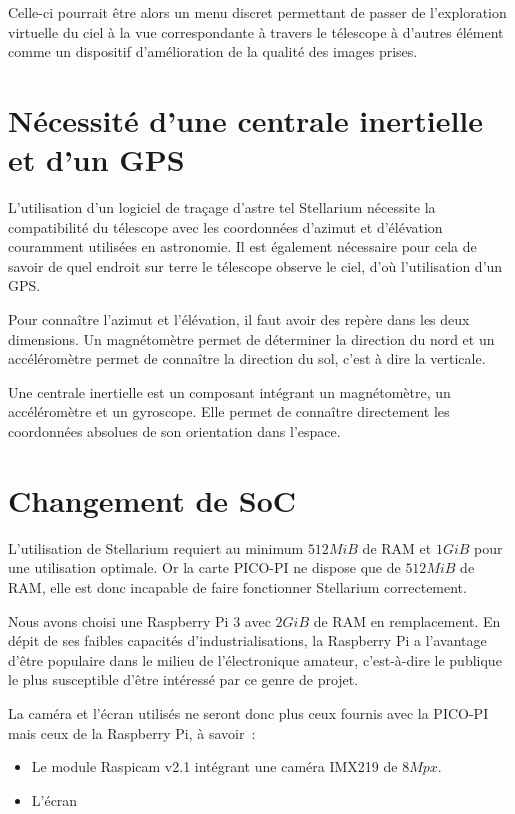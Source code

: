 Celle-ci pourrait être alors un menu discret permettant de passer de l'exploration virtuelle du ciel à la vue correspondante à travers le télescope à d'autres élément comme un dispositif d'amélioration de la qualité des images prises.

\section{Nécessité d'une centrale inertielle et d'un GPS}

L'utilisation d'un logiciel de traçage d'astre tel Stellarium nécessite la compatibilité du télescope avec les coordonnées d'azimut et d'élévation couramment utilisées en astronomie. Il est également nécessaire pour cela de savoir de quel endroit sur terre le télescope observe le ciel, d'où l'utilisation d'un GPS.

\vspace{1cm}

Pour connaître l'azimut et l'élévation, il faut avoir des repère dans les deux dimensions. Un magnétomètre permet de déterminer la direction du nord et un accéléromètre permet de connaître la direction du sol, c'est à dire la verticale.

Une centrale inertielle est un composant intégrant un magnétomètre, un accéléromètre et un gyroscope. Elle permet de connaître directement les coordonnées absolues de son orientation dans l'espace.

\section{Changement de SoC}

L'utilisation de Stellarium requiert au minimum $512MiB$ de RAM et $1GiB$ pour une utilisation optimale. Or la carte PICO-PI ne dispose que de $512MiB$ de RAM, elle est donc incapable de faire fonctionner Stellarium correctement.

\vspace{1cm}

Nous avons choisi une Raspberry Pi 3 avec $2GiB$ de RAM en remplacement. En dépit de ses faibles capacités d'industrialisations, la Raspberry Pi a l'avantage d'être populaire dans le milieu de l'électronique amateur, c'est-à-dire le publique le plus susceptible d'être intéressé par ce genre de projet.

\vspace{1cm}

La caméra et l'écran utilisés ne seront donc plus ceux fournis avec la PICO-PI mais ceux de la Raspberry Pi, à savoir~:
\begin{itemize}[label=$\bullet$]
	\item Le module Raspicam v2.1 intégrant une caméra IMX219 de $8Mpx$.
	\item L'écran
	\end{itemize}


